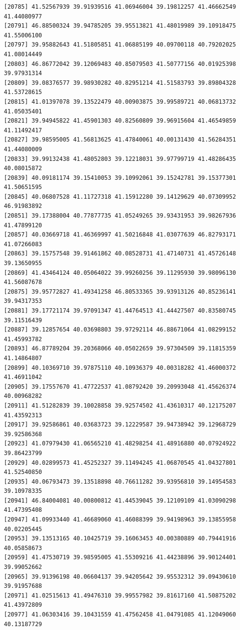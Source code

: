 \documentclass[
  letterpaper,
  DIV=11,
  numbers=noendperiod]{scrartcl}
\begin{document}
\begin{verbatim}
[20785] 41.52567939 39.91939516 41.06946004 39.19812257 41.46662549 41.44080977
[20791] 46.88500324 39.94785205 39.95513821 41.48019989 39.10918475 41.55006100
[20797] 39.95882643 41.51805851 41.06885199 40.09700118 40.79202025 41.08014449
[20803] 46.86772042 39.12069483 40.85079503 41.50777156 40.01925398 39.97931314
[20809] 39.08376577 39.98930282 40.82951214 41.51583793 39.89804328 41.53728615
[20815] 41.01397078 39.13522479 40.00903875 39.99589721 40.06813732 41.05035401
[20821] 39.94945822 41.45901303 40.82560809 39.96915604 41.46549859 41.11492417
[20827] 39.98595005 41.56813625 41.47840061 40.00131430 41.56284351 41.44080009
[20833] 39.99132438 41.48052803 39.12218031 39.97799719 41.48286435 40.08015872
[20839] 40.09181174 39.15410053 39.10992061 39.15242781 39.15377301 41.50651595
[20845] 40.06807528 41.11727318 41.15912280 39.14129629 40.07309952 46.91983892
[20851] 39.17388004 40.77877735 41.05249265 39.93431953 39.98267936 41.47899120
[20857] 40.03669718 41.46369997 41.50216848 41.03077639 46.82793171 41.07266083
[20863] 39.15757548 39.91461862 40.08528731 41.47140731 41.45726148 39.13650955
[20869] 41.43464124 40.05064022 39.99260256 39.11295930 39.98096130 41.56087678
[20875] 39.95772827 41.49341258 46.80533365 39.93913126 40.85236141 39.94317353
[20881] 39.17721174 39.97091347 41.44764513 41.44427507 40.83580745 39.11516439
[20887] 39.12857654 40.03698803 39.97292114 46.88671064 41.08299152 41.45993782
[20893] 46.87789204 39.20368066 40.05022659 39.97304509 39.11815359 41.14864807
[20899] 40.10369710 39.97875110 40.10936379 40.00318282 41.46000372 41.46911042
[20905] 39.17557670 41.47722537 41.08792420 39.20993048 41.45626374 40.00968282
[20911] 41.51282839 39.10028858 39.92574502 41.43610317 40.12175207 41.43592313
[20917] 39.92586861 40.03683723 39.12229587 39.94738942 39.12968729 39.92586368
[20923] 41.07979430 41.06565210 41.48298254 41.48916880 40.07924922 39.86423799
[20929] 40.02899573 41.45252327 39.11494245 41.06870545 41.04327801 41.52540850
[20935] 40.06793473 39.13518898 40.76611282 39.93956810 39.14954583 39.10978335
[20941] 46.84004081 40.00800812 41.44539045 39.12109109 41.03090298 41.47395408
[20947] 41.09933440 41.46689060 41.46088399 39.94198963 39.13855958 40.02205445
[20953] 39.13513165 40.10425719 39.16063453 40.00380889 40.79441916 40.05858673
[20959] 41.47530719 39.98595005 41.55309216 41.44238896 39.90124401 39.99052662
[20965] 39.91396198 40.06604137 39.94205642 39.95532312 39.09430610 39.91957688
[20971] 41.02515613 41.49476310 39.99557982 39.81617160 41.50875202 41.43972809
[20977] 41.06303416 39.10431559 41.47562458 41.04791085 41.12049060 40.13187729

\end{verbatim}
\end{document}
